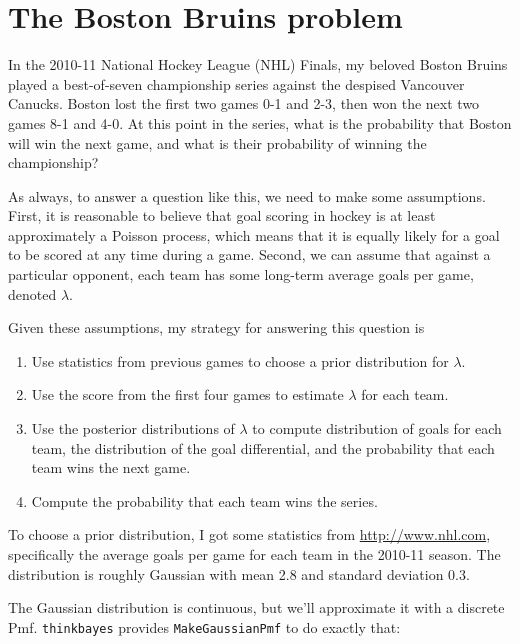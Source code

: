 \documentclass[12pt]{book}
\theoremstyle{exercise}
\begin{document}
\section{The Boston Bruins problem}

In the 2010-11 National Hockey League (NHL) Finals, my beloved Boston
Bruins played a best-of-seven championship series against the despised
Vancouver Canucks.  Boston lost the first two games 0-1 and 2-3, then
won the next two games 8-1 and 4-0.  At this point in the series, what
is the probability that Boston will win the next game, and what is
their probability of winning the championship?

As always, to answer a question like this, we need to make some
assumptions.  First, it is reasonable to believe that goal scoring in
hockey is at least approximately a Poisson process, which means that
it is equally likely for a goal to be scored at any time during a
game.  Second, we can assume that against a particular opponent, each team
has some long-term average goals per game, denoted $\lambda$.

Given these assumptions, my strategy for answering this question is

\begin{enumerate}

\item Use statistics from previous games to choose a prior
distribution for $\lambda$.

\item Use the score from the first four games to estimate $\lambda$
for each team.

\item Use the posterior distributions of $\lambda$ to compute 
distribution of goals for each team, the distribution of the
goal differential, and the probability that each team wins
the next game.

\item Compute the probability that each team wins the series.

\end{enumerate}

To choose a prior distribution, I got some statistics from
\url{http://www.nhl.com}, specifically the average goals per game
for each team in the 2010-11 season.  The distribution is roughly
Gaussian with mean 2.8 and standard deviation 0.3.

The Gaussian distribution is continuous, but we'll approximate it with
a discrete Pmf.  \verb"thinkbayes" provides \verb"MakeGaussianPmf" to
do exactly that:
\end{document}
